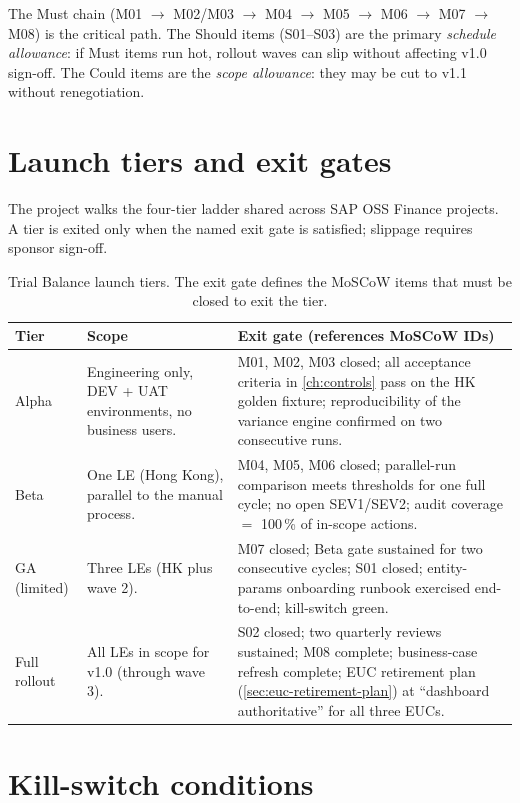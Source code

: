 \noindent
The Must chain (M01 $\to$ M02/M03 $\to$ M04 $\to$ M05 $\to$ M06 $\to$
M07 $\to$ M08) is the critical path. The Should items (S01--S03) are
the primary \emph{schedule allowance}: if Must items run hot, rollout
waves can slip without affecting v1.0 sign-off. The Could items are
the \emph{scope allowance}: they may be cut to v1.1 without renegotiation.

\section{Launch tiers and exit gates}\label{sec:tb-launch-tiers}

The project walks the four-tier ladder shared across SAP OSS Finance
projects. A tier is exited only when the named exit gate is satisfied;
slippage requires sponsor sign-off.

\begin{table}[htbp]
\centering
\caption{Trial Balance launch tiers. The exit gate defines the MoSCoW
items that must be closed to exit the tier.}
\label{tab:tb-launch-tiers}
\footnotesize
\begin{tabularx}{\linewidth}{@{}l l X@{}}
\toprule
\textbf{Tier} & \textbf{Scope} & \textbf{Exit gate (references MoSCoW IDs)} \\ \midrule
Alpha & Engineering only, DEV + UAT environments, no business users. & M01, M02, M03 closed; all acceptance criteria in \cref{ch:controls} pass on the HK golden fixture; reproducibility of the variance engine confirmed on two consecutive runs. \\
Beta  & One LE (Hong Kong), parallel to the manual process. & M04, M05, M06 closed; parallel-run comparison meets thresholds for one full cycle; no open SEV1/SEV2; audit coverage $=$ 100\,\% of in-scope actions. \\
GA (limited) & Three LEs (HK plus wave 2). & M07 closed; Beta gate sustained for two consecutive cycles; S01 closed; entity-params onboarding runbook exercised end-to-end; kill-switch green. \\
Full rollout & All LEs in scope for v1.0 (through wave 3). & S02 closed; two quarterly reviews sustained; M08 complete; business-case refresh complete; EUC retirement plan (\cref{sec:euc-retirement-plan}) at ``dashboard authoritative'' for all three EUCs. \\
\bottomrule
\end{tabularx}
\end{table}

\section{Kill-switch conditions}\label{sec:tb-kill-switch}

